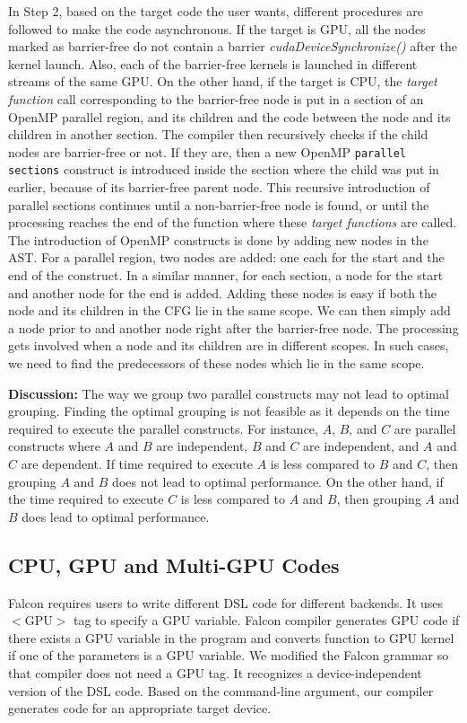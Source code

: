 In Step 2, based on the target code the user wants, different procedures are followed to make the code asynchronous.
If the target is GPU, all the nodes marked as barrier-free do not contain a barrier \textit{cudaDeviceSynchronize()} after the kernel launch. 
Also, each of the barrier-free kernels is launched in different streams of the same GPU.
On the other hand, if the target is CPU, the \textit{target function} call corresponding to the barrier-free node is put in a section of an OpenMP parallel region, and its children and the code between the node and its children in another section.
The compiler then recursively checks if the child nodes are barrier-free or not. 
If they are, then a new OpenMP \texttt{parallel sections} construct is introduced inside the section where the child was put in earlier, because of its barrier-free parent node.
This recursive introduction of parallel sections continues until a non-barrier-free node is found, or until the processing reaches the end of the function where these \textit{target functions} are called. 
The introduction of OpenMP constructs is done by adding new nodes in the AST.
For a parallel region, two nodes are added: one each for the start and the end of the construct. In a similar manner, for each section, a node for the start and another node for the end is added. 
Adding these nodes is easy if both the node and its children in the CFG lie in the same scope. 
We can then simply add a node prior to and another node right after the barrier-free node. 
The processing gets involved when a node and its children are in different scopes.
In such cases, we need to find the predecessors of these nodes which lie in the same scope.

\textbf{Discussion:} The way we group two parallel constructs may not lead to optimal grouping. 
Finding the optimal grouping is not feasible as it depends on the time required to execute the parallel constructs. 
For instance, $A$, $B$, and $C$ are parallel constructs where $A$ and $B$ are independent, $B$ and $C$ are independent, and $A$ and $C$ are dependent. 
If time required to execute $A$ is less compared to $B$ and $C$, then grouping $A$ and $B$ does not lead to optimal performance.
On the other hand, if the time required to execute $C$ is less compared to $A$ and $B$, then grouping $A$ and $B$ does lead to optimal performance.


\subsection{CPU, GPU and Multi-GPU Codes}\label{sec:cpugpu}
Falcon requires users to write different DSL code for different backends.
It uses $<$GPU$>$ tag to specify a GPU variable.
Falcon compiler generates GPU code if there exists a GPU variable in the program and converts function to GPU kernel if one of the parameters is a GPU variable.
We modified the Falcon grammar so that compiler does not need a GPU tag.
It recognizes a device-independent version of the DSL code.
Based on the command-line argument, our compiler generates code for an appropriate target device.

